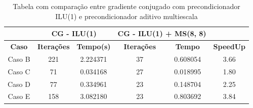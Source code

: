 \begin{table}[]

\caption{Tabela com comparação entre gradiente conjugado com precondicionador ILU(1) e precondicionador aditivo multiescala} \label{tab:comparacaoILU}

\begin{tabular}{c|c|c|c|c|c}
\cline{2-5}
                                    & \multicolumn{2}{c|}{\textbf{CG - ILU(1)}} & \multicolumn{2}{c|}{\textbf{CG - ILU(1) + MS(8, 8)}} &                                       \\ \hline
\multicolumn{1}{|c|}{\textbf{Caso}} & \textbf{Iterações}   & \textbf{Tempo(s)}  & \textbf{Iterações}          & \textbf{Tempo}         & \multicolumn{1}{c|}{\textbf{SpeedUp}} \\ \hline
\multicolumn{1}{|c|}{Caso B}        & 221                  & 2.224371           & 37                          & 0.608054               & \multicolumn{1}{c|}{3.66}             \\ \hline
\multicolumn{1}{|c|}{Caso C}        & 71                   & 0.034168           & 27                          & 0.018995               & \multicolumn{1}{c|}{1.80}             \\ \hline
\multicolumn{1}{|c|}{Caso D}        & 77                   & 0.334961           & 23                          & 0.148704               & \multicolumn{1}{c|}{2.25}             \\ \hline
\multicolumn{1}{|c|}{Caso E}        & 158                  & 3.082180           & 23                          & 0.803692               & \multicolumn{1}{c|}{3.84}             \\ \hline
\end{tabular}
\end{table}


